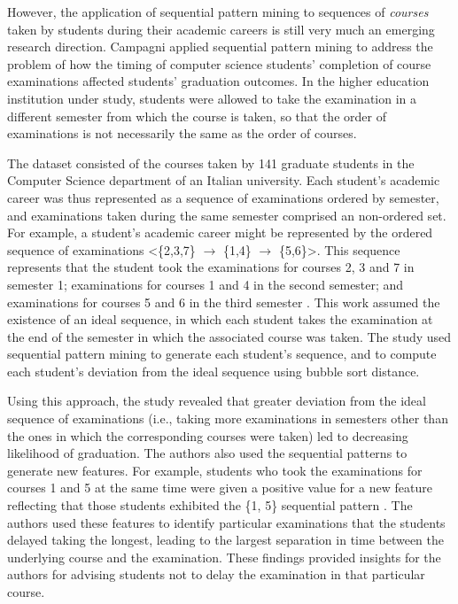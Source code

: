 However, the application of sequential pattern mining to sequences of \textit{courses} taken by students during their academic careers is still very much an emerging research direction.  Campagni \cite{Campagni} applied sequential pattern mining to address the problem of how the timing of computer science students' completion of course examinations affected students' graduation outcomes.  In the higher education institution under study, students were allowed to take the examination in a different semester from which the course is taken, so that the order of examinations is not necessarily the same as the order of courses.  

The dataset consisted of the courses taken by 141 graduate students in the Computer Science department of an Italian university.  Each student's academic career was thus represented as a sequence of examinations ordered by semester, and examinations taken during the same semester comprised an non-ordered set.  For example, a student's academic career might be represented by the ordered sequence of examinations \textless\{2,3,7\} $\rightarrow$ \{1,4\} $\rightarrow$ \{5,6\}\textgreater{}.  This sequence represents that the student took the examinations for courses 2, 3 and 7 in semester 1; examinations for courses 1 and 4 in the second semester; and examinations for courses 5 and 6 in the third semester \cite[Section 3]{Campagni}.  This work assumed the existence of an ideal sequence, in which each student takes the examination at the end of the semester in which the associated course was taken.  The study used sequential pattern mining to generate each student's sequence, and to compute each student's deviation from the ideal sequence using bubble sort distance.  

Using this approach, the study revealed that greater deviation from the ideal sequence of examinations (i.e., taking more examinations in semesters other than the ones in which the corresponding courses were taken) led to decreasing likelihood of graduation.  The authors also used the sequential patterns to generate new features.  For example, students who took the examinations for courses 1 and 5 at the same time were given a positive value for a new feature reflecting that those students exhibited the \{1, 5\} sequential pattern \cite[Table 8]{Campagni}.  The authors used these features to identify particular examinations that the students delayed taking the longest, leading to the largest separation in time between the underlying course and the examination.  These findings provided insights for the authors for advising students not to delay the examination in that particular course.

